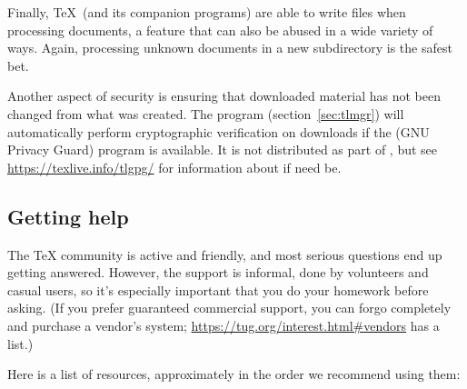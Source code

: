 \documentclass[12pt]{article}
\begin{document}
Finally, \TeX\ (and its companion programs) are able to write files when
processing documents, a feature that can also be abused in a wide
variety of ways.  Again, processing unknown documents in a new
subdirectory is the safest bet.

Another aspect of security is ensuring that downloaded material has not
been changed from what was created. The  program
(section~\ref{sec:tlmgr}) will automatically perform cryptographic
verification on downloads if the  (GNU Privacy Guard) program
is available. It is not distributed as part of \TL, but see
\url{https://texlive.info/tlgpg/} for information about  if
need be.

\subsection{Getting help}
\label{sec:help}

The \TeX{} community is active and friendly, and most serious questions
end up getting answered.  However, the support is informal, done by
volunteers and casual users, so it's especially important that you do
your homework before asking.  (If you prefer guaranteed commercial
support, you can forgo \TL{} completely and purchase a vendor's system;
\url{https://tug.org/interest.html#vendors} has a list.)

Here is a list of resources, approximately in the order we recommend
using them:
\end{document}
